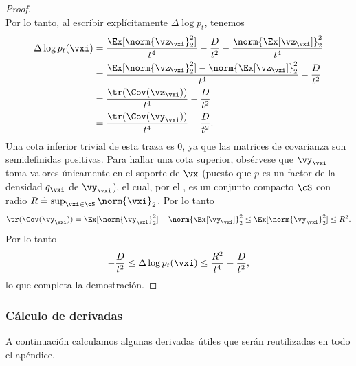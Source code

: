 \documentclass[../../book-main_es.tex]{subfiles}
\begin{document}
\begin{proof}
\begin{equation}
    \end{equation}
    Por lo tanto, al escribir explícitamente \(\Delta \log p_{t}\), tenemos
    \begin{align}
        \Delta \log p_{t}(\vxi)
        &= \frac{\Ex[\norm{\vz_{\vxi}}_{2}^{2}]}{t^{4}} -
        \frac{D}{t^{2}} - \frac{\norm{\Ex[\vz_{\vxi}]}_{2}^{2}}{t^{4}} \\
        &= \frac{\Ex[\norm{\vz_{\vxi}}_{2}^{2}] -
        \norm{\Ex[\vz_{\vxi}]}_{2}^{2}}{t^{4}} - \frac{D}{t^{2}} \\
        &= \frac{\tr(\Cov(\vz_{\vxi}))}{t^{4}} - \frac{D}{t^{2}} \\
        &= \frac{\tr(\Cov(\vy_{\vxi}))}{t^{4}} - \frac{D}{t^{2}}.
    \end{align}
    Una cota inferior trivial de esta traza es \(0\), ya que las matrices de covarianza
    son semidefinidas positivas. Para hallar una cota superior, obsérvese
    que \(\vy_{\vxi}\) toma valores únicamente en el soporte de \(\vx\)
    (puesto que \(p\) es un factor de la densidad \(q_{\vxi}\) de
    \(\vy_{\vxi}\)), el cual, por el
    , es un conjunto compacto
    \(\cS\) con radio \(R \doteq \sup_{\vxi \in \cS}\norm{\vxi}_{2}\). Por lo tanto
    \begin{equation}
        \tr(\Cov(\vy_{\vxi})) = \Ex[\norm{\vy_{\vxi}}_{2}^{2}] -
        \norm{\Ex[\vy_{\vxi}]}_{2}^{2} \leq
        \Ex[\norm{\vy_{\vxi}}_{2}^{2}] \leq R^{2}.
    \end{equation}
    Por lo tanto
    \begin{equation}
        -\frac{D}{t^{2}} \leq \Delta \log p_{t}(\vxi) \leq
        \frac{R^{2}}{t^{4}} - \frac{D}{t^{2}},
    \end{equation}
    lo que completa la demostración.
\end{proof}

\subsubsection{Cálculo de derivadas}

A continuación calculamos algunas derivadas útiles que serán 
reutilizadas en todo el apéndice.
\end{document}
